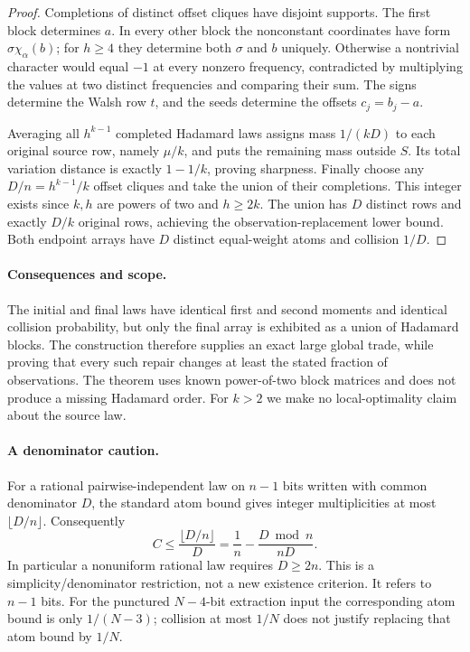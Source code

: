 \begin{proof}
Completions of distinct offset cliques have disjoint supports. The first
block determines $a$. In every other block the nonconstant coordinates
have form $\sigma\chi_\alpha(b)$; for $h\ge4$ they determine both
$\sigma$ and $b$ uniquely. Otherwise a nontrivial character would equal
$-1$ at every nonzero frequency, contradicted by multiplying the values
at two distinct frequencies and comparing their sum. The signs determine
the Walsh row $t$, and the seeds determine the offsets $c_j=b_j-a$.

Averaging all $h^{k-1}$ completed Hadamard laws assigns mass
$1/(kD)$ to each original source row, namely $\mu/k$, and puts the
remaining mass outside $S$. Its total variation distance is exactly
$1-1/k$, proving sharpness. Finally choose any
$D/n=h^{k-1}/k$ offset cliques and take the union of their completions.
This integer exists since $k,h$ are powers of two and $h\ge2k$.
The union has $D$ distinct rows and exactly $D/k$ original rows, achieving
the observation-replacement lower bound. Both endpoint arrays have
$D$ distinct equal-weight atoms and collision $1/D$.
\end{proof}

\paragraph{Consequences and scope.}
The initial and final laws have identical first and second moments and
identical collision probability, but only the final array is exhibited
as a union of Hadamard blocks. The construction therefore supplies an
exact large global trade, while proving that every such repair changes
at least the stated fraction of observations. The theorem uses known
power-of-two block matrices and does not produce a missing Hadamard
order. For $k>2$ we make no local-optimality claim about the source law.

\paragraph{A denominator caution.}
For a rational pairwise-independent law on $n-1$ bits written with
common denominator $D$, the standard atom bound gives integer
multiplicities at most $\lfloor D/n\rfloor$. Consequently
\[
 C\le\frac{\lfloor D/n\rfloor}{D}
 =\frac1n-\frac{D\bmod n}{nD}.
\]
In particular a nonuniform rational law requires $D\ge2n$.
This is a simplicity/denominator restriction, not a new existence
criterion. It refers to $n-1$ bits. For the punctured $N-4$-bit extraction
input the corresponding atom bound is only $1/(N-3)$; collision at most
$1/N$ does not justify replacing that atom bound by $1/N$.
